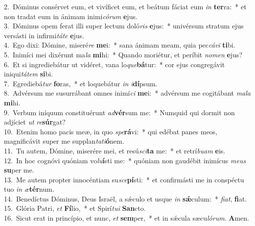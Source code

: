 {2.~}Dóminus consérvet eum, et vivíficet eum, et beátum fáciat eum \textit{in} \textbf{ter}ra:~* et non tradat eum in ánimam inimi\textit{có}\textit{rum} \textbf{e}jus.\\
{3.~}Dóminus opem ferat illi super lectum doló\textit{ris} \textbf{e}jus:~* univérsum stratum ejus versásti in infirmi\textit{tá}\textit{te} \textbf{e}jus.\\
{4.~}Ego dixi: Dómine, miseré\textit{re} \textbf{me}i:~* sana ánimam meam, quia pec\textit{cá}\textit{vi} \textbf{ti}bi.\\
{5.~}Inimíci mei dixérunt ma\textit{la} \textbf{mi}hi:~* Quando moriétur, et períbit \textit{no}\textit{men} \textbf{e}jus?\\
{6.~}Et si ingrediebátur ut vidéret, vana lo\textit{que}\textbf{bá}tur:~* cor ejus congregávit iniqui\textit{tá}\textit{tem} \textbf{si}bi.\\
{7.~}Egrediebá\textit{tur} \textbf{fo}ras,~* et loquebátur \textit{in} \textit{i}\textbf{dí}psum.\\
{8.~}Advérsum me susurrábant omnes inimí\textit{ci} \textbf{me}i:~* advérsum me cogitábant \textit{ma}\textit{la} \textbf{mi}hi.\\
{9.~}Verbum iníquum constituérunt \textit{ad}\textbf{vér}sum me:~* Numquid qui dormit non adjíciet \textit{ut} \textit{re}\textbf{súr}gat?\\
{10.~}Etenim homo pacis meæ, in quo \textit{spe}\textbf{rá}vi:~* qui edébat panes meos, magnificávit super me supplan\textit{ta}\textit{ti}\textbf{ó}nem.\\
{11.~}Tu autem, Dómine, miserére mei, et resú\textit{sci}\textbf{ta} me:~* et retrí\textit{bu}\textit{am} \textbf{e}is.\\
{12.~}In hoc cognóvi quóniam vo\textit{lu}\textbf{í}sti me:~* quóniam non gaudébit inimícus \textit{me}\textit{us} \textbf{su}per me.\\
{13.~}Me autem propter innocéntiam su\textit{sce}\textbf{pí}sti:~* et confirmásti me in conspéctu tuo \textit{in} \textit{æ}\textbf{tér}num.\\
{14.~}Benedíctus Dóminus, Deus Israël, a sǽculo et usque \textit{in} \textbf{sǽ}culum:~* \textit{fi}\textit{at}, \textbf{fi}at.\\
{15.~}Glória Patri, \textit{et} \textbf{Fí}lio,~* et Spirí\textit{tu}\textit{i} \textbf{San}cto.\\
{16.~}Sicut erat in princípio, et nunc, \textit{et} \textbf{sem}per,~* et in sǽcula sæcu\textit{ló}\textit{rum}. \textbf{A}men.\\
